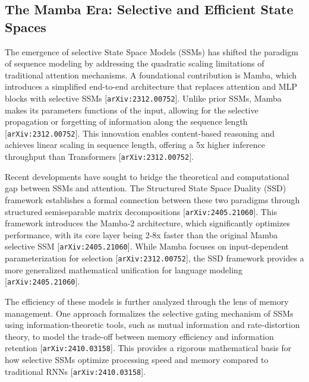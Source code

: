 \documentclass[11pt]{article}
\begin{document}
\subsection{The Mamba Era: Selective and Efficient State Spaces}

The emergence of selective State Space Models (SSMs) has shifted the paradigm of sequence modeling by addressing the quadratic scaling limitations of traditional attention mechanisms. A foundational contribution is Mamba, which introduces a simplified end-to-end architecture that replaces attention and MLP blocks with selective SSMs [\texttt{arXiv:2312.00752}]. Unlike prior SSMs, Mamba makes its parameters functions of the input, allowing for the selective propagation or forgetting of information along the sequence length [\texttt{arXiv:2312.00752}]. This innovation enables content-based reasoning and achieves linear scaling in sequence length, offering a 5x higher inference throughput than Transformers [\texttt{arXiv:2312.00752}].

Recent developments have sought to bridge the theoretical and computational gap between SSMs and attention. The Structured State Space Duality (SSD) framework establishes a formal connection between these two paradigms through structured semiseparable matrix decompositions [\texttt{arXiv:2405.21060}]. This framework introduces the Mamba-2 architecture, which significantly optimizes performance, with its core layer being 2-8x faster than the original Mamba selective SSM [\texttt{arXiv:2405.21060}]. While Mamba focuses on input-dependent parameterization for selection [\texttt{arXiv:2312.00752}], the SSD framework provides a more generalized mathematical unification for language modeling [\texttt{arXiv:2405.21060}].

The efficiency of these models is further analyzed through the lens of memory management. One approach formalizes the selective gating mechanism of SSMs using information-theoretic tools, such as mutual information and rate-distortion theory, to model the trade-off between memory efficiency and information retention [\texttt{arXiv:2410.03158}]. This provides a rigorous mathematical basis for how selective SSMs optimize processing speed and memory compared to traditional RNNs [\texttt{arXiv:2410.03158}].
\end{document}
